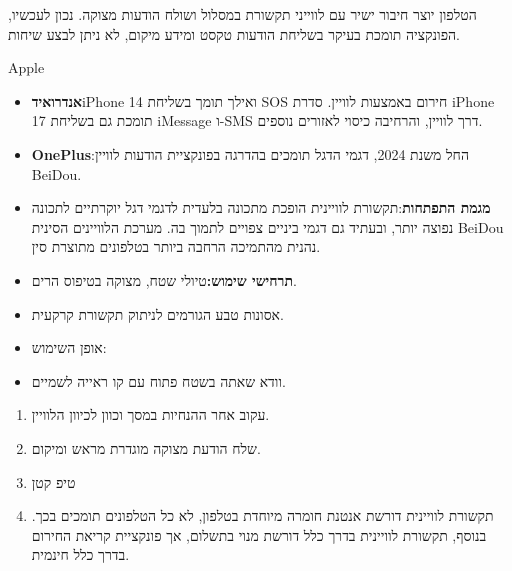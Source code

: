 


הטלפון יוצר חיבור ישיר עם לווייני תקשורת במסלול ושולח הודעות מצוקה. נכון לעכשיו, הפונקציה תומכת בעיקר בשליחת הודעות טקסט ומידע מיקום, לא ניתן לבצע שיחות.


Apple


\begin{itemize}
  \item \textbf{אנדרואיד}iPhone 14 ואילך תומך בשליחת SOS חירום באמצעות לוויין. סדרת iPhone 17 תומכת גם בשליחת iMessage ו-SMS דרך לוויין, והרחיבה כיסוי לאזורים נוספים.
  \item \textbf{OnePlus}:החל משנת 2024, דגמי הדגל תומכים בהדרגה בפונקציית הודעות לוויין BeiDou.
  \item \textbf{מגמת התפתחות}:תקשורת לוויינית הופכת מתכונה בלעדית לדגמי דגל יוקרתיים לתכונה נפוצה יותר, ובעתיד גם דגמי ביניים צפויים לתמוך בה. מערכת הלוויינים הסינית BeiDou נהנית מהתמיכה הרחבה ביותר בטלפונים מתוצרת סין.
  \item \textbf{תרחישי שימוש:}טיולי שטח, מצוקה בטיפוס הרים.
\end{itemize}


\begin{itemize}
  \item אסונות טבע הגורמים לניתוק תקשורת קרקעית.
  \item אופן השימוש:
  \item וודא שאתה בשטח פתוח עם קו ראייה לשמיים.
\end{itemize}


\begin{enumerate}
  \item עקוב אחר ההנחיות במסך וכוון לכיוון הלוויין.
  \item שלח הודעת מצוקה מוגדרת מראש ומיקום.
  \item טיפ קטן
  \item תקשורת לוויינית דורשת אנטנת חומרה מיוחדת בטלפון, לא כל הטלפונים תומכים בכך. בנוסף, תקשורת לוויינית בדרך כלל דורשת מנוי בתשלום, אך פונקציית קריאת החירום בדרך כלל חינמית.
\end{enumerate}

